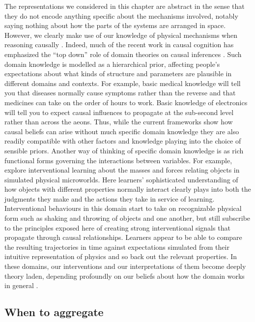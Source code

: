 \documentclass{cambridge7A}%
\begin{document}
The representations we considered in this chapter are abstract in the sense that they do not encode anything specific about the mechanisms involved, notably saying nothing about how the parts of the systems are arranged in space.  However, we clearly make use of our knowledge of physical mechanisms when reasoning causally \citep{ahn1995role,bramley2018physics}.  Indeed, much of the recent work in causal cognition has emphasized the ``top down'' role of domain theories on causal inferences \citep{griffiths2009theory,griffiths2005causes,lake2015human}.  Such domain knowledge is modelled as a hierarchical prior, affecting people's expectations about what kinds of structure and parameters are plausible in different domains and contexts.  For example, basic medical knowledge will tell you that diseases normally cause symptoms rather than the reverse and that medicines can take on the order of hours to work.  Basic knowledge of electronics will tell you to expect causal influences to propagate at the sub-second level rather than across the aeons.  Thus, while the current frameworks show how causal beliefs can arise without much specific domain knowledge they are also readily compatible with other factors and knowledge playing into the choice of sensible priors.  Another way of thinking of specific domain knowledge is as rich functional forms governing the interactions between variables.  For example, \cite{bramley2018physics} explore interventional learning about the masses and forces relating objects in simulated physical microworlds.  Here learners' sophisticated understanding of how objects with different properties normally interact clearly plays into both the judgments they make and the actions they take in service of learning.  Interventional behaviours in this domain start to take on recognizable physical form such as shaking and throwing of objects and one another, but still subscribe to the principles exposed here of creating strong interventional signals that propagate through causal relationships.  Learners appear to be able to compare the resulting trajectories in time against expectations simulated from their intuitive representation of physics and so back out the relevant properties.  In these domains, our interventions and our interpretations of them become deeply theory laden, depending profoundly on our beliefs about how the domain works in general \citep{bramley2017neurath}.

\subsection{When to aggregate}
\end{document}
